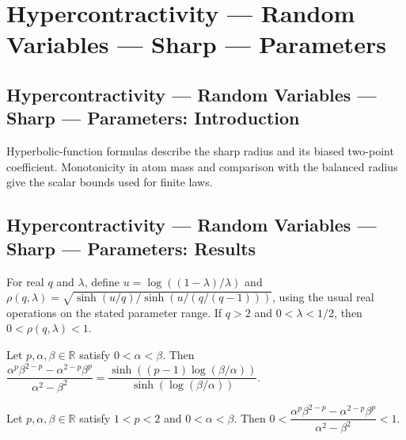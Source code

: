 \section{Hypercontractivity --- Random Variables --- Sharp --- Parameters}
\subsection*{Hypercontractivity --- Random Variables --- Sharp --- Parameters: Introduction}
Hyperbolic-function formulas describe the sharp radius and its biased two-point coefficient. Monotonicity in atom mass and comparison with the balanced radius give the scalar bounds used for finite laws.

\subsection*{Hypercontractivity --- Random Variables --- Sharp --- Parameters: Results}

\begin{theorem}
\leanok
{}
For real $q$ and $\lambda$, define $u=\log((1-\lambda)/\lambda)$ and
$\rho(q,\lambda)=\sqrt{\sinh(u/q)/\sinh(u/(q/(q-1)))}$, using the usual real operations
on the stated parameter range. If $q>2$ and $0<\lambda<1/2$, then $0<\rho(q,\lambda)<1$.
\end{theorem}

\begin{theorem}
\leanok
{}
Let $p,\alpha,\beta\in\mathbb R$ satisfy $0<\alpha<\beta$. Then
$\dfrac{\alpha^p\beta^{2-p}-\alpha^{2-p}\beta^p}{\alpha^2-\beta^2}=\dfrac{\sinh((p-1)\log(\beta/\alpha))}{\sinh(\log(\beta/\alpha))}$.
\end{theorem}

\begin{theorem}
\leanok
{}
Let $p,\alpha,\beta\in\mathbb{R}$ satisfy $1<p<2$ and $0<\alpha<\beta$. Then
$0<\dfrac{\alpha^p\beta^{2-p}-\alpha^{2-p}\beta^p}{\alpha^2-\beta^2}<1$.
\end{theorem}

